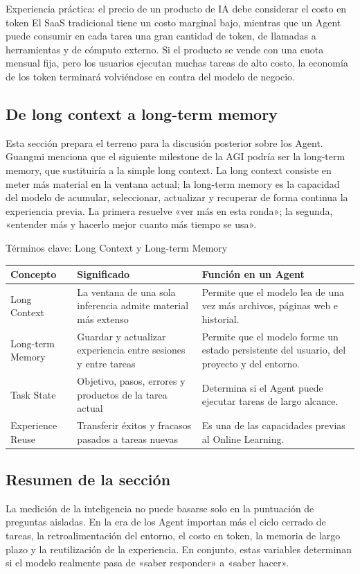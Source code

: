 \begin{importantbox}{Experiencia práctica: el precio de un producto de IA debe considerar el costo en token}
El SaaS tradicional tiene un costo marginal bajo, mientras que un Agent puede consumir en cada tarea una gran cantidad de token, de llamadas a herramientas y de cómputo externo. Si el producto se vende con una cuota mensual fija, pero los usuarios ejecutan muchas tareas de alto costo, la economía de los token terminará volviéndose en contra del modelo de negocio.
\end{importantbox}

\subsection{De long context a long-term memory}

Esta sección prepara el terreno para la discusión posterior sobre los Agent. Guangmi menciona que el siguiente milestone de la AGI podría ser la long-term memory, que sustituiría a la simple long context. La long context consiste en meter más material en la ventana actual; la long-term memory es la capacidad del modelo de acumular, seleccionar, actualizar y recuperar de forma continua la experiencia previa. La primera resuelve «ver más en esta ronda»; la segunda, «entender más y hacerlo mejor cuanto más tiempo se usa».

\begin{knowledgebox}{Términos clave: Long Context y Long-term Memory}
\noindent\begin{tabularx}{\textwidth}{p{}p{}X}
\toprule
Concepto & Significado & Función en un Agent \\
\midrule
Long Context & La ventana de una sola inferencia admite material más extenso & Permite que el modelo lea de una vez más archivos, páginas web e historial. \\
Long-term Memory & Guardar y actualizar experiencia entre sesiones y entre tareas & Permite que el modelo forme un estado persistente del usuario, del proyecto y del entorno. \\
Task State & Objetivo, pasos, errores y productos de la tarea actual & Determina si el Agent puede ejecutar tareas de largo alcance. \\
Experience Reuse & Transferir éxitos y fracasos pasados a tareas nuevas & Es una de las capacidades previas al Online Learning. \\
\bottomrule
\end{tabularx}
\end{knowledgebox}

\subsection{Resumen de la sección}

La medición de la inteligencia no puede basarse solo en la puntuación de preguntas aisladas. En la era de los Agent importan más el ciclo cerrado de tareas, la retroalimentación del entorno, el costo en token, la memoria de largo plazo y la reutilización de la experiencia. En conjunto, estas variables determinan si el modelo realmente pasa de «saber responder» a «saber hacer».
